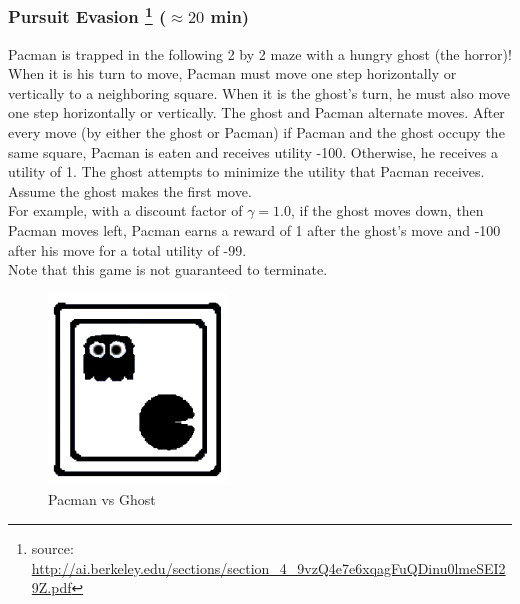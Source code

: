 \documentclass[a4paper, 10pt]{article}
\begin{document}
\subsubsection{ Pursuit Evasion \protect\footnote{source: \url{http://ai.berkeley.edu/sections/section_4_9vzQ4e7e6xqagFuQDinu0lmeSEI29Z.pdf}} ($\approx 20$ min)}
\begin{minipage}{0.7\textwidth}
Pacman is trapped in the following 2 by 2 maze with a hungry ghost (the horror)!
When it is his turn to move, Pacman must move one step horizontally or vertically to a
neighboring square. When it is the ghost’s turn, he must also move one step horizontally
or vertically. The ghost and Pacman alternate moves. After every move (by either the
ghost or Pacman) if Pacman and the ghost occupy the same square, Pacman is eaten
and receives utility -100. Otherwise, he receives a utility of 1. The ghost attempts
to minimize the utility that Pacman receives. Assume the ghost makes the first
move.\\
For example, with a discount factor of $\gamma = 1.0$, if the ghost moves down, then Pacman moves left, Pacman earns
a reward of 1 after the ghost’s move and -100 after his move for a total utility of -99.\\
Note that this game is not guaranteed to terminate.

\end{minipage}
\begin{minipage}{0.25\textwidth}
\begin{figure}[H]
    \centering
    \includegraphics[width=.8\textwidth]{figures/pacman.png}
    \caption{Pacman vs Ghost}
    \label{fig:pacman}
\end{figure}
\end{minipage}
\end{document}
